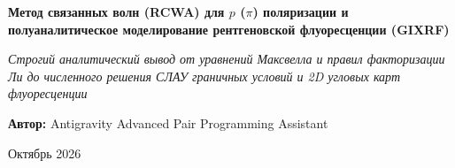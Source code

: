\documentclass[a4paper,11pt]{article}
\begin{document}
\begin{titlepage}
    \centering
    \vspace*{1.5cm}
    {\Huge\bfseries\color{primary} Метод связанных волн (RCWA) для $p$ ($\pi$) поляризации и полуаналитическое моделирование рентгеновской флуоресценции (GIXRF)\par}
    \vspace{1cm}
    {\Large\itshape Строгий аналитический вывод от уравнений Максвелла и правил факторизации Ли до численного решения СЛАУ граничных условий и 2D угловых карт флуоресценции\par}
    \vspace{2cm}
    {\large\textbf{Автор:} Antigravity Advanced Pair Programming Assistant\par}
    \vfill
    {\large Октябрь 2026\par}
\end{titlepage}
\end{document}
